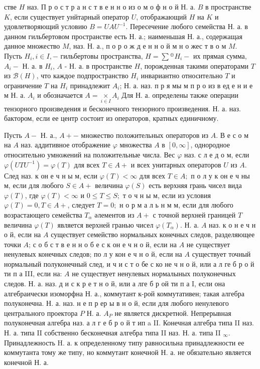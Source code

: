\documentclass[10pt]{article}
\begin{document}
стве $H$ наз. П р о с т р а н с т в е н н о из о м о ф н о й Н. а. $B$ в пространстве $K$, если существует унйтарный оператор $U$, отображающий $H$ на $K$ и удовлетворяющий условию $B=U A U^{-1}$. Пересечение любого семейства Н. а. в данном гильбертовом пространстве есть Н. а.; наименьшая Н. а., содержащая данное множество $M$, наз. Н. а., п о р о ж д е н н о й м н о жес т в о м $M$. Пусть $H_{i}, i \in I,-$ гильбертовы пространства, $H=\sum{ }^{\oplus} H_{i}-$ их прямая сумма, $A_{i}-$ Н. а. в $H_{i}$, $A$ - Н. а. в пространстве $H$, порожденная такими операторами $T$ из $\mathscr{B}(H)$, что каждое подпространство $H_{i}$ инвариантно относительно $T$ и ограничение $T$ на $H_{i}$ принадлежит $A_{i}$; Н. а. наз. п р я мы м п р о из в ед е н и е м Н. а. $A_{i}$ и обозначается $A=\underset{i \in I}{\times} A_{i}$ Для Н. а. определены также операции тензорного произведения и бесконечного тензорного произведения. Н. а. наз. бактором, если ее центр состоит из операторов, кратных единичному.



Пусть $A-$ Н. а., $A+-$ множество положительных операторов из $A$. В е с о м на $A$ наз. аддитивное отображение $\varphi$ множества $A$ в $[0, \infty]$, однородное относительно умножений на положительные числа. Вес $\varphi$ наз. с л е д о м, если $\varphi\left(U T U^{-1}\right)=\varphi(T)$ для всех $T \in A+$ и всех унитарных операторов $U$ из $A$. След наз. к он е ч н ы м, если $\varphi(T)<\infty$ для всех $T \in A ;$ п о л у к он е ч ны м, если для любого $S \in A+$ величина $\varphi(S)$ есть верхняя грань чисел вида $\varphi(T)$, где $\varphi(T)<\infty$ и $0 \leqslant T \leqslant S ;$ т о ч н ы м, если из условия $\varphi(T)=0, T \in A+$, следует $T=0 ;$ н о р м а л ь н м м, если для любого возрастающего семейства $T_{\alpha}$ әлементов из $A+$ с точной верхней границей $T$ величина $\varphi(T)$ является верхней гранью чисел $\varphi\left(T_{\alpha}\right)$. Н. а. $A$ наз. к о н е ч н о й, если на $A$ существует семейство нормальных конечных следов, разделяющее точки $A$; с о б с т в е н н о б е с к он е ч н о й, если на $A$ не существует ненулевых конечных следов; по л у кон е ч н о й, если на $A$ существует точный нормальный полуконечный след, и ч и с т о бе с ко не ч н о й, или а л ге б р о й ти п а III, если на: $A$ не существует ненулевых нормалыных полуконечных следов. Н. а. наз. д и с к р е т н о й, или а лге б р ой ти п а I, если она алгебраически изоморфна Н. а., коммутант к-рой коммутативен; такая алгебра полуконечна. Н. а. наз. н е п р ер ы в н о й, если для любого ненулевого центрального проектора $P$ Н. а. $A_{P}$ не является дискретной. Непрерывная полуконечная алгебра наз. а л г е б р о й т ип a II. Конечная алгебра типа II наз. Н. а. типа II собственно бесконечная алгебра типа II наз. Н. а. типа II ${ }_{\infty}$. Принадлежность H. а. к определенному типу равносильна принадлежности ее коммутанта тому же типу, но коммутант конечной Н. а. не обязательно является конечной Н. а.
\end{document}
